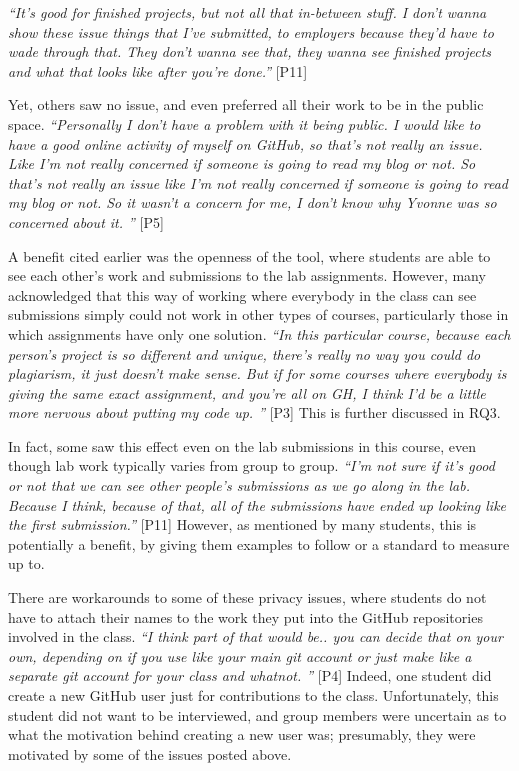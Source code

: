 \textit{``It's good for finished projects, but not all that in-between stuff. I don't wanna show these issue things that I've submitted, to employers because they'd have to wade through that. They don't wanna see that, they wanna see finished projects and what that looks like after you're done.''} [P11]

Yet, others saw no issue, and even preferred all their work to be in the public space. \textit{``Personally I don't have a problem with it being public. I would like to have a good online activity of myself on GitHub, so that's not really an issue. Like I'm not really concerned if someone is going to read my blog or not. So that's not really an issue like I'm not really concerned if someone is going to read my blog or not. So it wasn't a concern for me, I don't know why Yvonne was so concerned about it. ''} [P5]

A benefit cited earlier was the openness of the tool, where students are able to see each other's work and submissions to the lab assignments. However, many acknowledged that this way of working where everybody in the class can see submissions simply could not work in other types of courses, particularly those in which assignments have only one solution. \textit{``In this particular course, because each person's project is so different and unique, there's really no way you could do plagiarism, it just doesn't make sense. But if for some courses where everybody is giving the same exact assignment, and you're all on GH, I think I'd be a little more nervous about putting my code up. ''} [P3] This is further discussed in RQ3.

In fact, some saw this effect even on the lab submissions in this course, even though lab work typically varies from group to group. \textit{``I'm not sure if it's good or not that we can see other people's submissions as we go along in the lab. Because I think, because of that, all of the submissions have ended up looking like the first submission.''} [P11] However, as mentioned by many students, this is potentially a benefit, by giving them examples to follow or a standard to measure up to.

There are workarounds to some of these privacy issues, where students do not have to attach their names to the work they put into the GitHub repositories involved in the class. \textit{``I think part of that would be.. you can decide that on your own, depending on if you use like your main git account or just make like a separate git account for your class and whatnot. ''} [P4] Indeed, one student did create a new GitHub user just for contributions to the class. Unfortunately, this student did not want to be interviewed, and group members were uncertain as to what the motivation behind creating a new user was; presumably, they were motivated by some of the issues posted above.

